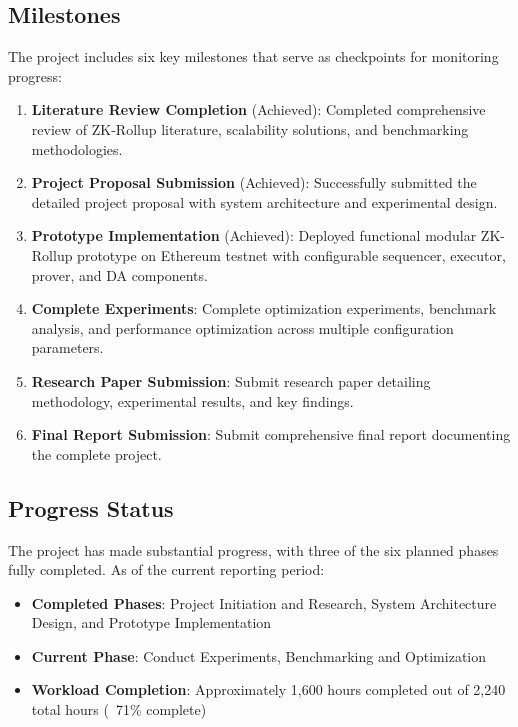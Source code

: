 \subsection{Milestones}
\vspace{12pt}
The project includes six key milestones that serve as checkpoints for monitoring progress:
\begin{enumerate}
    \item \textbf{Literature Review Completion} (Achieved): Completed comprehensive review of ZK-Rollup literature, scalability solutions, and benchmarking methodologies.
    \item \textbf{Project Proposal Submission} (Achieved): Successfully submitted the detailed project proposal with system architecture and experimental design.
    \item \textbf{Prototype Implementation} (Achieved): Deployed functional modular ZK-Rollup prototype on Ethereum testnet with configurable sequencer, executor, prover, and DA components.
    \item \textbf{Complete Experiments}: Complete optimization experiments, benchmark analysis, and performance optimization across multiple configuration parameters.
    \item \textbf{Research Paper Submission}: Submit research paper detailing methodology, experimental results, and key findings.
    \item \textbf{Final Report Submission}: Submit comprehensive final report documenting the complete project.
\end{enumerate}

\vspace{12pt}
\subsection{Progress Status}
\vspace{12pt}
The project has made substantial progress, with three of the six planned phases fully completed. As of the current reporting period:

\begin{itemize}
    \item \textbf{Completed Phases}: Project Initiation and Research, System Architecture Design, and Prototype Implementation
    \item \textbf{Current Phase}: Conduct Experiments, Benchmarking and Optimization
    \item \textbf{Workload Completion}: Approximately 1,600 hours completed out of 2,240 total hours (~71\% complete)
\end{itemize}


